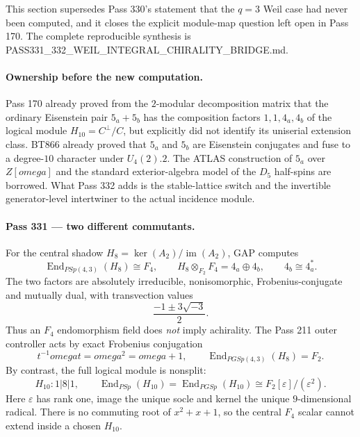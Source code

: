 \documentclass[12pt,a4paper]{article}
\def\mathbb#1{#1}%
\def\mathrm#1{#1}%
\def\texttt#1{#1}%
\def\omega{omega}%
\theoremstyle{definition}
\newcommand{\PSp}{\mathrm{PSp}}
\newcommand{\FF}{\mathbb{F}}
\newcommand{\ZZ}{\mathbb{Z}}
\begin{document}
This section supersedes Pass 330's statement that the $q=3$ Weil case had never
been computed, and it closes the explicit module-map question left open in
Pass 170. The complete reproducible synthesis is
\texttt{PASS331\_332\_WEIL\_INTEGRAL\_CHIRALITY\_BRIDGE.md}.

\paragraph{Ownership before the new computation.}
Pass 170 already proved from the $2$-modular decomposition matrix that the
ordinary Eisenstein pair $5_a+5_b$ has the composition factors
$1,1,4_a,4_b$ of the logical module $H_{10}=C^\perp/C$, but explicitly did not
identify its uniserial extension class. BT866 already proved that $5_a$ and
$5_b$ are Eisenstein conjugates and fuse to a degree-$10$ character under
$U_4(2).2$. The ATLAS construction of $5_a$ over $\ZZ[\omega]$ and the standard
exterior-algebra model of the $D_5$ half-spins are borrowed. What Pass 332 adds
is the stable-lattice switch and the invertible generator-level intertwiner to
the actual incidence module.

\paragraph{Pass 331 --- two different commutants.}
For the central shadow $H_8=\ker(A_2)/\operatorname{im}(A_2)$, GAP computes
\[
 \operatorname{End}_{\PSp(4,3)}(H_8)\cong\FF_4,
 \qquad
 H_8\otimes_{\FF_2}\FF_4=4_a\oplus4_b,
 \qquad 4_b\cong4_a^*.
\]
The two factors are absolutely irreducible, nonisomorphic, Frobenius-conjugate
and mutually dual, with transvection values
\[
 \frac{-1\pm3\sqrt{-3}}2.
\]
Thus an $\FF_4$ endomorphism field does \emph{not} imply achirality. The Pass 211
outer controller acts by exact Frobenius conjugation
\[
 t^{-1}\omega t=\omega^2=\omega+1,
 \qquad
 \operatorname{End}_{\mathrm{PGSp}(4,3)}(H_8)=\FF_2.
\]
By contrast, the full logical module is nonsplit:
\[
 H_{10}:1|8|1,
 \qquad
 \operatorname{End}_{\PSp}(H_{10})
 =\operatorname{End}_{\mathrm{PGSp}}(H_{10})
 \cong\FF_2[\varepsilon]/(\varepsilon^2).
\]
Here $\varepsilon$ has rank one, image the unique socle and kernel the unique
$9$-dimensional radical. There is no commuting root of $x^2+x+1$, so the central
$\FF_4$ scalar cannot extend inside a chosen $H_{10}$.
\end{document}
